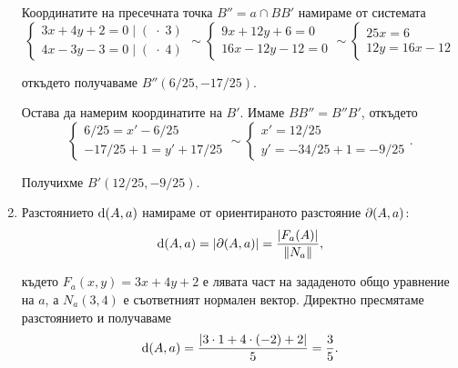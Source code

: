 \documentclass[numbers=endperiod]{scrartcl}
\begin{document}
\begin{solution}
\begin{enumerate}[label=\alph*)]
        Координатите на пресечната точка $B'' = a \cap BB'$ намираме от системата
        \begin{displaymath}
            \begin{cases}
                3x + 4y + 2 = 0 \;|\; (\;\cdot\; 3) \\
                4x - 3y - 3 = 0 \;|\; (\;\cdot\; 4)
            \end{cases}
            \sim
            \begin{cases}
                9x + 12y + 6 = 0 \\
                16x - 12y - 12 = 0
            \end{cases}
            \sim
            \begin{cases}
                25x = 6 \\
                12y = 16x - 12
            \end{cases}
        \end{displaymath}

        откъдето получаваме $B''(6/25, -17/25)$.

        Остава да намерим координатите на $B'$. Имаме $BB'' = B''B'$, откъдето
        \begin{displaymath}
            \begin{cases}
                6/25 = x' - 6/25 \\
                -17/25 + 1 = y' + 17/25
            \end{cases}
            \sim
            \begin{cases}
                x' = 12/25 \\
                y' = -34/25 + 1 = -9/25
            \end{cases}.
        \end{displaymath}

        Получихме $B'(12/25, -9/25)$.

        \item Разстоянието $\operatorname{d}(A, a)$ намираме от ориентираното разстояние $\partial(A, a)$:
        \begin{displaymath}
            \operatorname{d}(A, a) = \left\vert \partial(A, a) \right\vert = \frac {\left\vert F_a(A) \right\vert} {\left\Vert N_a \right\Vert},
        \end{displaymath}

        където $F_a(x, y) = 3x + 4y + 2$ е лявата част на зададеното общо уравнение на $a$, а $N_a(3, 4)$ е съответният нормален вектор. Директно пресмятаме разстоянието и получаваме
        \begin{displaymath}
            \operatorname{d}(A, a) = \frac {\left\vert 3 \cdot 1 + 4 \cdot (-2) + 2 \right\vert} 5 = \frac 3 5.
        \end{displaymath}


\end{enumerate}
\end{solution}
\end{document}
